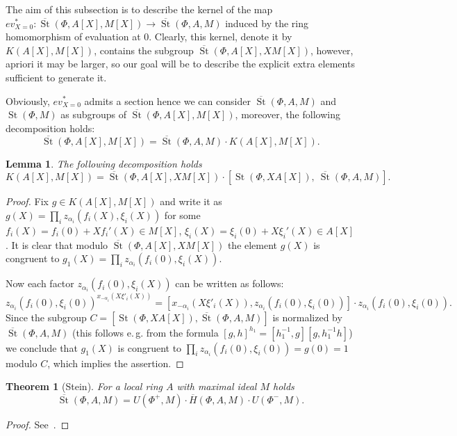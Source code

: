 \documentclass[oneside, 8pt]{amsart}
\newtheorem{theorem}{Theorem}
\newtheorem{lemma}{Lemma}
\theoremstyle{remark}
\theoremstyle{definition}
\DeclareMathOperator{\St}{St}
\numberwithin{equation}{section}
\begin{document}
The aim of this subsection is to describe the kernel of the map $ev_{X=0}^*\colon\overline{\St}(\Phi, A[X], M[X]) \to \overline{\St}(\Phi, A, M)$
induced by the ring homomorphism of evaluation at $0$. Clearly, this kernel, denote it by $K(A[X], M[X])$, contains the subgroup $\overline{\St}(\Phi, A[X], XM[X])$, however, apriori it may be larger, so our goal will be to describe the explicit extra elements sufficient to generate it.

Obviously, $ev_{X=0}^*$ admits a section hence we can consider $\overline{\St}(\Phi, A, M)$ and $\St(\Phi, M)$ as subgroups of $\overline{\St}(\Phi, A[X], M[X])$,
 moreover, the following decomposition holds:
\begin{equation} \label{relZero-decomp} \overline{\St}(\Phi, A[X], M[X]) = \overline{\St}(\Phi, A, M) \cdot K(A[X], M[X]).\end{equation}
\begin{lemma} 
The following decomposition holds
 \[ K(A[X], M[X]) = \overline{\St}(\Phi, A[X], XM[X]) \cdot \left[\St(\Phi, XA[X]),\ \overline{\St}(\Phi, A, M)\right].\] 
\end{lemma}
\begin{proof}
 Fix $g \in K(A[X], M[X])$ and write it as $g(X) = \prod_i z_{\alpha_i}(f_i(X), \xi_i(X))$ for some $f_i(X) = f_i(0) + Xf_i'(X) \in M[X]$, $\xi_i(X) = \xi_i(0) + X\xi_i'(X) \in A[X]$.
 It is clear that modulo $\overline{\St}(\Phi, A[X], XM[X])$ the element $g(X)$ is congruent to $g_1(X) = \prod_i z_{\alpha_i}(f_i(0), \xi_i(X)).$ 
 
 Now each factor $z_{\alpha_i}(f_i(0), \xi_i(X))$ can be written as follows:
 \[z_{\alpha_i}(f_i(0), \xi_i(0))^{x_{-\alpha_i}(X\xi'_i(X))} = [x_{-\alpha_i}(X\xi'_i(X)), z_{\alpha_i}(f_i(0), \xi_i(0))] \cdot z_{\alpha_i}(f_i(0), \xi_i(0)).\]
 Since the subgroup $C = \left[\St(\Phi, XA[X]), \overline{\St}(\Phi, A, M)\right]$ is normalized by $\overline{\St}(\Phi, A, M)$ 
 (this follows e.\,g. from the formula $[g, h]^{h_1} = [h_1^{-1}, g][g, h_1^{-1}h]$) we conclude that $g_1(X)$ is congruent to $\prod_i z_{\alpha_i}(f_i(0), \xi_i(0)) = g(0) = 1$ modulo $C$,
 which implies the assertion. \qedhere
\end{proof}

\begin{theorem}[Stein] \label{thmStein} For a local ring $A$ with maximal ideal $M$ holds \[\overline{\St}(\Phi, A, M) = U(\Phi^+, M) \cdot \overline{H}(\Phi, A, M) \cdot U(\Phi^-, M).\] \end{theorem} \begin{proof} See~\cite[Theorem~2.4]{Ste73}. \end{proof}
\end{document}
